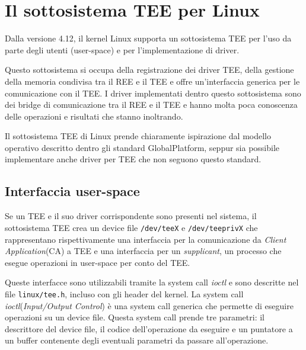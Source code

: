 \documentclass[12pt,italian]{report}
\begin{document}
\section{Il sottosistema TEE per Linux}
\label{sec:sottosistema-tee-per-linux}
Dalla versione 4.12, il kernel Linux supporta un sottosistema TEE
\cite{linux_tee_subsystem}
per l'uso da parte degli utenti (user-space) e per l'implementazione
di driver.

Questo sottosistema si occupa della registrazione dei driver TEE, della
gestione della memoria condivisa tra il REE e il TEE e offre un'interfaccia
generica per le comunicazione con il TEE.
I driver implementati dentro questo sottosistema sono dei bridge di
comunicazione tra il REE e il TEE e hanno molta poca conoscenza delle
operazioni e risultati che stanno inoltrando.

Il sottosistema TEE di Linux prende chiaramente ispirazione dal modello
operativo descritto dentro gli standard GlobalPlatform, seppur sia possibile
implementare anche driver per TEE che non seguono questo standard.

\subsection{Interfaccia user-space}
\label{subsec:interfaccia-user-space}
Se un TEE e il suo driver corrispondente sono presenti nel sistema,
il sottosistema TEE crea un device file \texttt{/dev/teeX} e
\texttt{/dev/teeprivX} che rappresentano rispettivamente una interfaccia
per la comunicazione da \textit{Client Application}(CA) a TEE e una
interfaccia per un \textit{supplicant}, un processo che esegue operazioni
in user-space per conto del TEE.

Queste interfacce sono utilizzabili tramite la system call \textit{ioctl}
e sono descritte nel file \texttt{linux/tee.h}, incluso con gli header
del kernel.
La system call \textit{ioctl}(\textit{Input/Output Control})
è una system call generica che permette di
eseguire operazioni su un device file.
Questa system call prende tre parametri:
il descrittore del device file, il codice dell'operazione da eseguire e
un puntatore a un buffer contenente degli eventuali parametri da passare
all'operazione.
\end{document}
